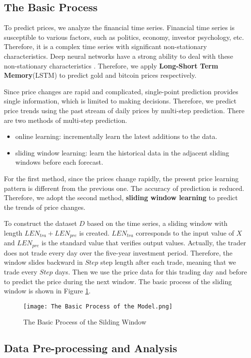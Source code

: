 \documentclass[12pt]{article}
\begin{document}
\subsection{The Basic Process}
To predict prices, we analyze the financial time series. Financial time series is susceptible to various factors, such as politics, economy, investor psychology, etc. Therefore, it is a complex time series with significant non-stationary characteristics. Deep neural networks have a strong ability to deal with these non-stationary characteristics \cite{7}. Therefore, we apply \textbf{Long-Short Term Memory}(LSTM) to predict gold and bitcoin prices respectively.

Since price changes are rapid and complicated, single-point prediction provides single information, which is limited to making decisions. Therefore, we predict price trends using the past stream of daily prices by multi-step prediction. There are two methods of multi-step prediction.
\begin{itemize}
\item online learning: incrementally learn the latest additions to the data.
\item sliding window learning: learn the historical data in the adjacent sliding windows before each forecast.
\end{itemize}
For the first method, since the prices change rapidly, the present price learning pattern is different from the previous one. The accuracy of prediction is reduced. Therefore, we adopt the second method, \textbf{sliding window learning} to predict the trends of price changes.

To construct the dataset $D$ based on the time series, a sliding window with length $LEN_{tra} + LEN_{pre}$ is created. $LEN_{tra}$ corresponds to the input value of $X$ and $LEN_{pre}$ is the standard value that verifies output values. Actually, the trader does not trade every day over the five-year investment period. Therefore, the window slides backward in $Step$ step length after each trade, meaning that we trade every $Step$ days. Then we use the price data for this trading day and before to predict the price during the next window. The basic process of the sliding window is shown in Figure \ref{F4}.
\begin{figure}[htb]
\centering
\texttt{[image: The Basic Process of the Model.png]}
\caption{The Basic Process of the Silding Window}
\label{F4} %
\end{figure}

\subsection{Data Pre-processing and Analysis}
\end{document}
